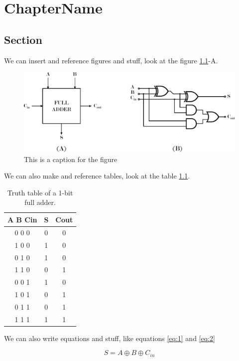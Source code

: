\chapter{ChapterName}
\label{chap1}

\section{Section}

We can insert and reference figures and stuff, look at the figure \ref{fig:fa}-A.

\begin{figure}[ht]
\centering
\includegraphics[width=\textwidth]{chapters/figures/fa} 
\caption{This is a caption for the figure}
\label{fig:fa}
\end{figure}

We can also make and reference tables, look at the table \ref{tab:1}.

\begin{table}[ht]
\centering
\begin{tabular}{ccc}
\toprule
A B Cin & S & Cout\\
\midrule
0 0 0 & 0 & 0\\
1 0 0 & 1 & 0\\
0 1 0 & 1 & 0\\
1 1 0 & 0 & 1\\
0 0 1 & 1 & 0\\
1 0 1 & 0 & 1\\
0 1 1 & 0 & 1\\
1 1 1 & 1 & 1\\
\bottomrule
\end{tabular}
\caption{Truth table of a 1-bit full adder.}
\label{tab:1}
\end{table}
	
We can also write equations and stuff, like equations \ref{eq:1} and \ref{eq:2}

\begin{equation}
S = A \oplus B \oplus C_{in}
\label{eq:1}
\end{equation}

